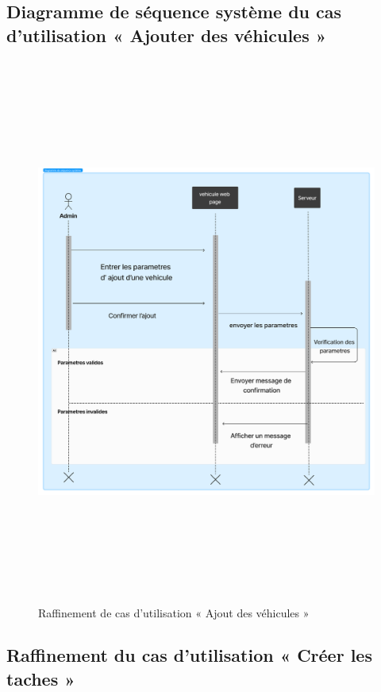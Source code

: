 \subsection{Diagramme de séquence système du cas d’utilisation « Ajouter des véhicules »}
\begin{figure}[h!]
  \centering
  \includegraphics[width=1\textwidth,height=18cm]{chap4.images/dss ajout vehicules.png}
  \caption{Raffinement de cas d’utilisation « Ajout des véhicules »}

\end{figure}

\newpage
\subsection{Raffinement du cas d'utilisation « Créer les taches »}

